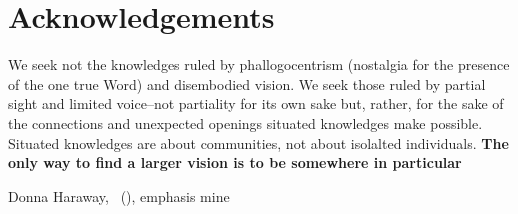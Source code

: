 \documentclass[11pt,a4paper,twoside,openany]{report}
\begin{document}
\begingroup
  \tableofcontents
  \listoffigures
  \listoftables
\endgroup
  \newpage
\section*{Acknowledgements}
\epigraph{We seek not the knowledges ruled by phallogocentrism (nostalgia for
  the presence of the one true Word) and disembodied vision. We seek those ruled
by partial sight and limited voice--not partiality for its own sake but, rather,
for the sake of the connections and unexpected openings situated knowledges make
possible. Situated knowledges are about communities, not about isolalted
individuals. \textbf{The only way to find a larger vision is to be somewhere in
  particular}}%
{Donna Haraway, ~(\citeyear{haraway}), emphasis mine}
\end{document}
